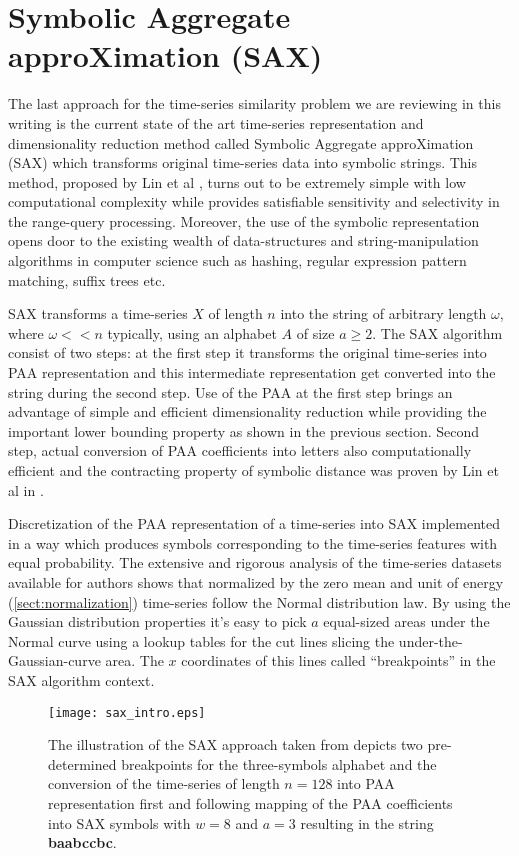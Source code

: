 \section{Symbolic Aggregate approXimation (SAX)}
The last approach for the time-series similarity problem we are reviewing in this writing is the current state of the art time-series representation and dimensionality reduction method called Symbolic Aggregate approXimation (SAX) which transforms original time-series data into symbolic strings. This method, proposed by Lin et al \cite{citeulike:2821475}, turns out to be extremely simple with low computational complexity while provides satisfiable sensitivity and selectivity in the range-query processing. Moreover, the use of the symbolic representation opens door to the existing wealth of data-structures and string-manipulation algorithms in computer science such as hashing, regular expression pattern matching, suffix trees etc.

SAX transforms a time-series $X$ of length $n$ into the string of arbitrary length $\omega$, where $\omega << n$ typically, using an alphabet $A$ of size $ a \geq 2$. The SAX algorithm consist of two steps: at the first step it transforms the original time-series into PAA representation and this intermediate representation get converted into the string during the second step. Use of the PAA at the first step brings an advantage of simple and efficient dimensionality reduction while providing the important lower bounding property as shown in the previous section. Second step, actual conversion of PAA coefficients into letters also computationally efficient and the contracting property of symbolic distance was proven by Lin et al in \cite{citeulike:532335}.

Discretization of the PAA representation of a time-series into SAX implemented in a way which produces symbols corresponding to the time-series features with equal probability. The extensive and rigorous analysis of the time-series datasets available for authors shows that normalized by the zero mean and unit of energy (\ref{sect:normalization}) time-series follow the Normal distribution law. By using the Gaussian distribution properties it's easy to pick $a$ equal-sized areas under the Normal curve using a lookup tables \cite{citeulike:167581} for the cut lines slicing the under-the-Gaussian-curve area. The $x$ coordinates of this lines called ``breakpoints'' in the SAX algorithm context.
\begin{figure}[tbp]
   \centering
   \texttt{[image: sax\_intro.eps]}
   \caption{The illustration of the SAX approach taken from \cite{citeulike:2821475} depicts two pre-determined breakpoints for the three-symbols alphabet and the conversion of the time-series of length $n=128$ into PAA representation first and following mapping of the PAA coefficients into SAX symbols with $w=8$ and $a=3$ resulting in the string \textbf{baabccbc}.}
   \label{fig:sax_intro}
\end{figure}

